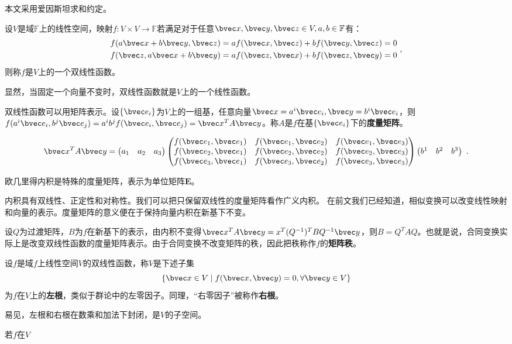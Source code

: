 本文采用爱因斯坦求和约定。

\begin{definition}{}
设$V$是域$\mathbb F$上的线性空间，映射$f:V\times V\rightarrow\mathbb F$若满足对于任意$\bvec x,\bvec y,\bvec z \in V,a,b\in \mathbb F$有：
\begin{equation}
\begin{aligned}
f(a\bvec x+b\bvec y,\bvec z)&=af(\bvec x,\bvec z)+bf(\bvec y,\bvec z)=0\\
f(\bvec z,a\bvec x+b\bvec y)&=af(\bvec z,\bvec  x)+bf(\bvec z,\bvec y)=0
\end{aligned}~,
\end{equation}
则称$f$是$V$上的一个双线性函数。
\end{definition}

显然，当固定一个向量不变时，双线性函数就是$V$上的一个线性函数。

双线性函数可以用矩阵表示。设$\{\bvec e_i\}$为$V$上的一组基，任意向量$\bvec x=a^i\bvec e_i,\bvec y=b^i\bvec e_i$，则$f(a^i\bvec e_i,b^j\bvec e_j)=a^ib^jf(\bvec e_i,\bvec e_j)=\bvec x^TA\bvec y$。称$A$是$f$在基$\{\bvec e_i\}$下的\textbf{度量矩阵}。
\begin{example}{}
\begin{equation}
\bvec x^TA\bvec y=\begin{pmatrix}
 a_1 &a_2  &a_3
\end{pmatrix}
\begin{pmatrix}
  f(\bvec e_1,\bvec e_1)& f(\bvec e_1,\bvec e_2) &f(\bvec e_1,\bvec e_3) \\
 f(\bvec e_2,\bvec e_1) &f(\bvec e_2,\bvec e_2)  &f(\bvec e_2,\bvec e_3) \\
 f(\bvec e_3,\bvec e_1) & f(\bvec e_3,\bvec e_2) &f(\bvec e_3,\bvec e_3)
\end{pmatrix}
 \begin{pmatrix}
 b^1 &b^2  &b^3
\end{pmatrix}~.
\end{equation}
\end{example}
\begin{example}{}
欧几里得内积是特殊的度量矩阵，表示为单位矩阵$\boldsymbol E$。
\end{example}
内积具有双线性、正定性和对称性。我们可以把只保留双线性的度量矩阵看作广义内积。
在前文我们已经知道，相似变换可以改变线性映射和向量的表示。度量矩阵的意义便在于保持向量内积在新基下不变。

设$Q$为过渡矩阵，$B$为$f$在新基下的表示，由内积不变得$\bvec x^TA\bvec y=x^T(Q^{-1})^TBQ^{-1}\bvec y$，则$B=Q^{T}AQ$。也就是说，合同变换实际上是改变双线性函数的度量矩阵表示。由于合同变换不改变矩阵的秩，因此把秩称作$f$的\textbf{矩阵秩}。
\begin{definition}{}
设$f$是域$f$上线性空间$V$的双线性函数，称$V$是下述子集
\begin{equation}
\{\bvec x \in V \mid f(\bvec x, \bvec y)=0, \forall \bvec y\in V\}
\end{equation}
为$f$在$V$上的\textbf{左根}，类似于群论中的左零因子。同理，“右零因子”被称作\textbf{右根}。
\end{definition}
易见，左根和右根在数乘和加法下封闭，是$V$的子空间。
\begin{definition}{}
若$f$在$V$
\end{definition}
